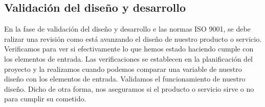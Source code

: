 \documentclass[12pt,a4paper]{article}
\begin{document}
\subsection{Validación del diseño y desarrollo}
En la fase de validación del diseño y desarrollo e las normas ISO 9001, se  debe ralizar una revisión como está avanzando el diseño de nuestro producto o servicio. Verificamos para ver si efectivamente lo que hemos estado haciendo cumple con los elementos de entrada. Las verificaciones se establecen en la planificación del proyecto y la realizamos cuando podemos comparar una variable de nuestro diseño con los elementos de entrada. Validamos el funcionamiento de nuestro diseño. Dicho de otra forma, nos aseguramos si el producto o servicio sirve o no para cumplir su cometido.
\end{document}
